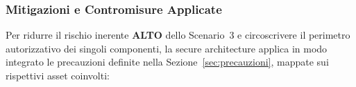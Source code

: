 \documentclass[11pt,a4paper]{article}
\begin{document}
%

\subsubsection{Mitigazioni e Contromisure Applicate}

Per ridurre il rischio inerente \textbf{ALTO} dello Scenario~3 e circoscrivere il perimetro autorizzativo dei singoli componenti, la secure architecture applica in modo integrato le precauzioni definite nella Sezione~\ref{sec:precauzioni}, mappate sui rispettivi asset coinvolti:
\end{document}
